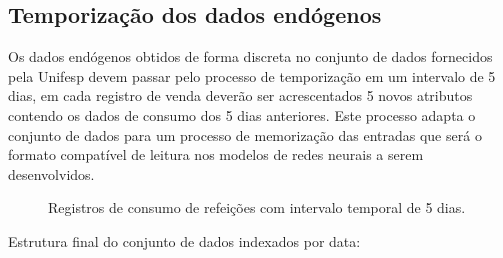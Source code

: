 \documentclass[	12pt, Times, openright, twoside, a4paper, english, brazil]{abntex2}
\begin{document}
	\subsection{Temporização dos dados endógenos}
        Os dados endógenos obtidos de forma discreta no conjunto de dados fornecidos pela Unifesp devem passar pelo processo de temporização em um intervalo de 5 dias, em cada registro de venda deverão ser acrescentados 5 novos atributos contendo os dados de consumo dos 5 dias anteriores. Este processo adapta o conjunto de dados para um processo de memorização das entradas que será o formato compatível de leitura nos modelos de redes neurais a serem desenvolvidos.
        \begin{figure}[!ht]
    		\caption{Registros de consumo de refeições com intervalo temporal de 5 dias.\label{fig:entr_almoco_offset}}
	    \end{figure}
        Estrutura final do conjunto de dados indexados por data:
        
        
	
\end{document}

